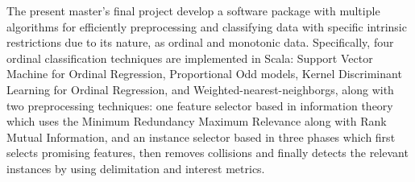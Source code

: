 
The present master's final project develop a software package with multiple algorithms for efficiently preprocessing and classifying data with specific intrinsic restrictions due to its nature, as ordinal and monotonic data. \newline
Specifically, four ordinal classification techniques are implemented in Scala: Support Vector Machine for Ordinal Regression, Proportional Odd models, Kernel Discriminant Learning for Ordinal Regression, and Weighted-nearest-neighborgs, along with two preprocessing techniques: one feature selector based in information theory which uses the Minimum Redundancy Maximum Relevance along with Rank Mutual Information, and an instance selector based in three phases which first selects promising features, then removes collisions and finally detects the relevant instances by using delimitation and interest metrics.
\newline \newline
{}
